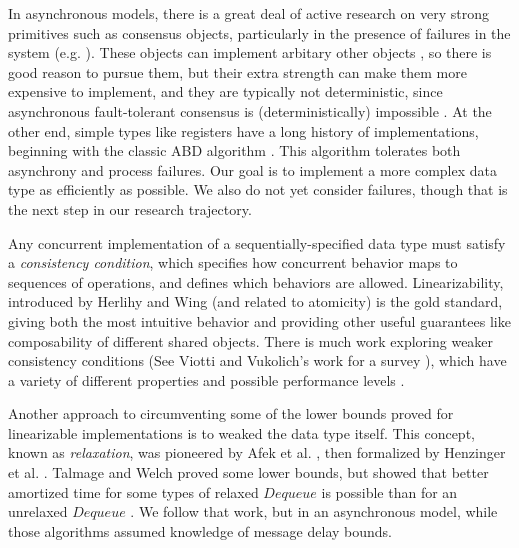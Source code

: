 \documentclass[a4paper,anonymous,USenglish]{lipics-v2021}
\theoremstyle{definition}
\begin{document}
In asynchronous models, there is a great deal of active research on very strong primitives such as consensus objects, particularly in the presence of failures in the system (e.g. \cite{PuFarahbakhshAlvisiEyal23,CohenKeidar23}).  These objects can implement arbitary other objects \cite{Herlihy91}, so there is good reason to pursue them, but their extra strength can make them more expensive to implement, and they are typically not deterministic, since asynchronous fault-tolerant consensus is (deterministically) impossible \cite{FischerLynchPaterson85}.  At the other end, simple types like registers have a long history of implementations, beginning with the classic ABD algorithm \cite{AttiyaBar-NoyDolev95}.  This algorithm tolerates both asynchrony and process failures.  Our goal is to implement a more complex data type as efficiently as possible.  We also do not yet consider failures, though that is the next step in our research trajectory.

Any concurrent implementation of a sequentially-specified data type must satisfy a \emph{consistency condition}, which specifies how concurrent behavior maps to sequences of operations, and defines which behaviors are allowed.  Linearizability, introduced by Herlihy and Wing \cite{HerlihyWing90} (and related to atomicity) is the gold standard, giving both the most intuitive behavior and providing other useful guarantees like composability of different shared objects.  There is much work exploring weaker consistency conditions (See Viotti and Vukolich's work for a survey \cite{viottiVukolic16}), which have a variety of different properties and possible performance levels \cite{AttiyaWelch94}.

Another approach to circumventing some of the lower bounds proved for linearizable implementations is to weaked the data type itself.  This concept, known as \emph{relaxation}, was pioneered by Afek et al. \cite{AfekKorlandYanovsky10}, then formalized by Henzinger et al. \cite{HenzingerKirschPayerSezginSokolova13}.  Talmage and Welch proved some lower bounds, but showed that better amortized time for some types of relaxed $Dequeue$ is possible than for an unrelaxed $Dequeue$ \cite{TalmageWelch14}.  We follow that work, but in an asynchronous model, while those algorithms assumed knowledge of message delay bounds.
\end{document}
